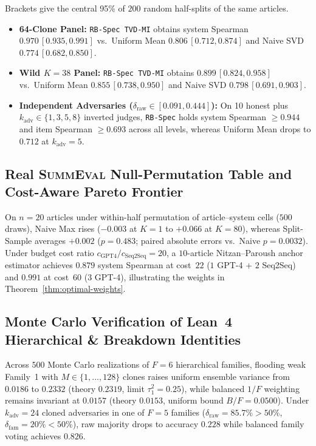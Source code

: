 Brackets give the central 95\% of $200$ random half-splits of the same articles.
\begin{itemize}[leftmargin=*,itemsep=2pt]
\item \textbf{64-Clone Panel:} \texttt{RB-Spec TVD-MI} obtains system Spearman
  $0.970\,[0.935, 0.991]$ vs.\ Uniform Mean $0.806\,[0.712, 0.874]$
   and Naive SVD $0.774\,[0.682, 0.850]$.
\item \textbf{Wild $K=38$ Panel:} \texttt{RB-Spec TVD-MI} obtains $0.899\,[0.824, 0.958]$
  vs.\ Uniform Mean $0.855\,[0.738, 0.950]$ and
  Naive SVD $0.798\,[0.691, 0.903]$.
\item \textbf{Independent Adversaries ($\delta_{\mathrm{raw}} \in [0.091, 0.444]$):}
  On 10 honest plus $k_{\mathrm{adv}} \in \{1,3,5,8\}$ inverted judges, \texttt{RB-Spec}
  holds system Spearman $\ge 0.944$ and item Spearman $\ge 0.693$ across all levels,
  whereas Uniform Mean drops to $0.712$ at $k_{\mathrm{adv}} = 5$.
\end{itemize}

\subsection{Real \textsc{SummEval} Null-Permutation Table and Cost-Aware Pareto Frontier}

On $n=20$ articles under within-half permutation of article--system cells ($500$ draws), Naive
Max rises ($-0.003$ at $K=1$ to $+0.066$ at $K=80$), whereas
Split-Sample averages $+0.002$ ($p=0.483$; paired absolute errors vs.\ Naive
$p=0.0032$). Under budget cost ratio $c_{\mathrm{GPT4}}/c_{\mathrm{Seq2Seq}} = 20$,
a $10$-article Nitzan--Paroush anchor estimator achieves $0.879$ system Spearman
at cost~$22$ ($1$ GPT-4 + $2$ Seq2Seq) and $0.991$ at cost~$60$ ($3$ GPT-4),
illustrating the weights in Theorem~\ref{thm:optimal-weights}.

\subsection{Monte Carlo Verification of Lean~4 Hierarchical \& Breakdown Identities}

Across $500$ Monte Carlo realizations of $F=6$ hierarchical families, flooding
weak Family~1 with $M \in \{1,\dots,128\}$ clones raises uniform ensemble
variance from $0.0186$ to $0.2332$ (theory $0.2319$, limit $\tau_1^2 = 0.25$), while
balanced $1/F$ weighting remains invariant at $0.0157$ (theory $0.0153$, uniform bound $B/F = 0.0500$).
Under $k_{\mathrm{adv}} = 24$ cloned adversaries in one of $F=5$ families
($\delta_{\mathrm{raw}} = 85.7\% > 50\%$, $\delta_{\mathrm{fam}} = 20\% < 50\%$),
raw majority drops to accuracy $0.228$ while balanced family voting achieves
$0.826$.

